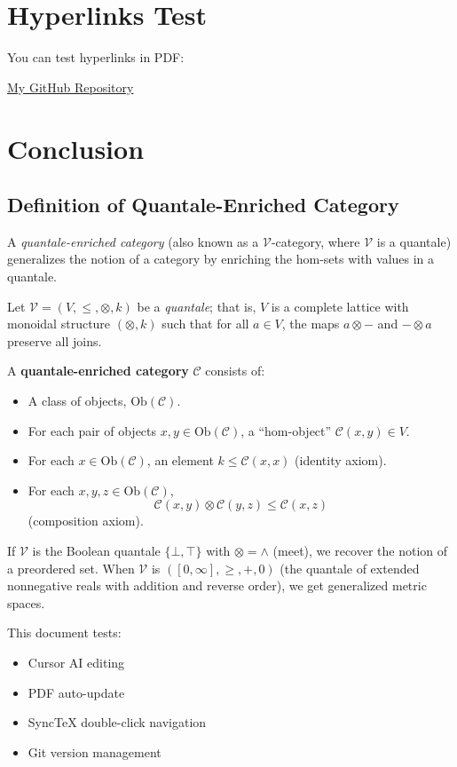 \documentclass{article}
\begin{document}
\section{Hyperlinks Test}

You can test hyperlinks in PDF:

\href{https://github.com/YiwenDing-Logic}{My GitHub Repository}

\section{Conclusion}


\subsection{Definition of Quantale-Enriched Category}

A \emph{quantale-enriched category} (also known as a $\mathcal{V}$-category, where $\mathcal{V}$ is a quantale) generalizes the notion of a category by enriching the hom-sets with values in a quantale. 

Let $\mathcal{V} = (V, \leq, \otimes, k)$ be a \emph{quantale}; that is, $V$ is a complete lattice with monoidal structure $(\otimes, k)$ such that for all $a \in V$, the maps $a \otimes -$ and $- \otimes a$ preserve all joins.

A \textbf{quantale-enriched category} $\mathcal{C}$ consists of:
\begin{itemize}
    \item A class of objects, $\mathrm{Ob}(\mathcal{C})$.
    \item For each pair of objects $x, y \in \mathrm{Ob}(\mathcal{C})$, a ``hom-object'' $\mathcal{C}(x, y) \in V$.
    \item For each $x \in \mathrm{Ob}(\mathcal{C})$, an element $k \leq \mathcal{C}(x, x)$ (identity axiom).
    \item For each $x, y, z \in \mathrm{Ob}(\mathcal{C})$, 
    \[\mathcal{C}(x, y) \otimes \mathcal{C}(y, z) \leq \mathcal{C}(x, z)\]
    (composition axiom).
\end{itemize}

If $\mathcal{V}$ is the Boolean quantale $\{\bot, \top\}$ with $\otimes = \wedge$ (meet), we recover the notion of a preordered set. When $\mathcal{V}$ is $([0, \infty], \geq, +, 0)$ (the quantale of extended nonnegative reals with addition and reverse order), we get generalized metric spaces.




This document tests:

\begin{itemize}
    \item Cursor AI editing
    \item PDF auto-update
    \item SyncTeX double-click navigation
    \item Git version management
\end{itemize}
\end{document}
